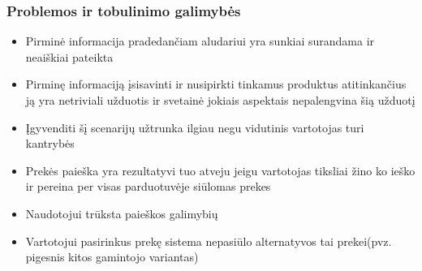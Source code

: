 \documentclass[oneside]{VUMIFPSkursinis}
\begin{document}
		\subsubsection{Problemos ir tobulinimo galimybės}
					\begin{itemize}
						\item{Pirminė informacija pradedančiam aludariui yra sunkiai surandama ir neaiškiai pateikta}
						\item{Pirminę informaciją įsisavinti ir nusipirkti tinkamus produktus atitinkančius ją yra netriviali užduotis ir svetainė jokiais aspektais nepalengvina šią užduotį}
						\item{Įgyvenditi šį scenarijų užtrunka ilgiau negu vidutinis vartotojas turi kantrybės}
						\item{Prekės paieška yra rezultatyvi tuo atveju jeigu vartotojas tiksliai žino ko ieško ir pereina per visas parduotuvėje siūlomas prekes}
						\item{Naudotojui trūksta paieškos galimybių}
						\item{Vartotojui pasirinkus prekę sistema nepasiūlo alternatyvos tai prekei(pvz. pigesnis kitos gamintojo variantas)}
					\end{itemize}
\end{document}
